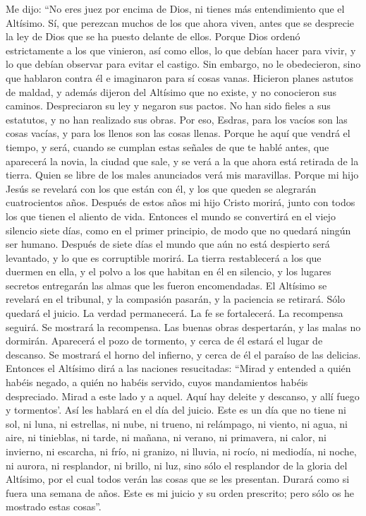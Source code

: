  Me dijo: ``No eres juez por encima de Dios, ni tienes
más entendimiento que el Altísimo.  Sí, que perezcan
muchos de los que ahora viven, antes que se desprecie la ley de Dios que
se ha puesto delante de ellos.  Porque Dios ordenó
estrictamente a los que vinieron, así como ellos, lo que debían hacer
para vivir, y lo que debían observar para evitar el castigo.
 Sin embargo, no le obedecieron, sino que hablaron contra
él e imaginaron para sí cosas vanas.  Hicieron planes
astutos de maldad, y además dijeron del Altísimo que no existe, y no
conocieron sus caminos.  Despreciaron su ley y negaron
sus pactos. No han sido fieles a sus estatutos, y no han realizado sus
obras.  Por eso, Esdras, para los vacíos son las cosas
vacías, y para los llenos son las cosas llenas.  Porque
he aquí que vendrá el tiempo, y será, cuando se cumplan estas señales de
que te hablé antes, que aparecerá la novia, la ciudad que sale, y se
verá a la que ahora está retirada de la tierra.  Quien se
libre de los males anunciados verá mis maravillas. 
Porque mi hijo Jesús se revelará con los que están con él, y los que
queden se alegrarán cuatrocientos años.  Después de estos
años mi hijo Cristo morirá, junto con todos los que tienen el aliento de
vida.  Entonces el mundo se convertirá en el viejo
silencio siete días, como en el primer principio, de modo que no quedará
ningún ser humano.  Después de siete días el mundo que
aún no está despierto será levantado, y lo que es corruptible morirá.
 La tierra restablecerá a los que duermen en ella, y el
polvo a los que habitan en él en silencio, y los lugares secretos
entregarán las almas que les fueron encomendadas.  El
Altísimo se revelará en el tribunal, y la compasión pasarán, y la
paciencia se retirará.  Sólo quedará el juicio. La verdad
permanecerá. La fe se fortalecerá.  La recompensa
seguirá. Se mostrará la recompensa. Las buenas obras despertarán, y las
malas no dormirán.  Aparecerá el pozo de tormento, y
cerca de él estará el lugar de descanso. Se mostrará el horno del
infierno, y cerca de él el paraíso de las delicias. 
Entonces el Altísimo dirá a las naciones resucitadas: ``Mirad y entended
a quién habéis negado, a quién no habéis servido, cuyos mandamientos
habéis despreciado.  Mirad a este lado y a aquel. Aquí
hay deleite y descanso, y allí fuego y tormentos'. Así les hablará en el
día del juicio.  Este es un día que no tiene ni sol, ni
luna, ni estrellas,  ni nube, ni trueno, ni relámpago, ni
viento, ni agua, ni aire, ni tinieblas, ni tarde, ni mañana,
 ni verano, ni primavera, ni calor, ni invierno, ni
escarcha, ni frío, ni granizo, ni lluvia, ni rocío,  ni
mediodía, ni noche, ni aurora, ni resplandor, ni brillo, ni luz, sino
sólo el resplandor de la gloria del Altísimo, por el cual todos verán
las cosas que se les presentan.  Durará como si fuera una
semana de años.  Este es mi juicio y su orden prescrito;
pero sólo os he mostrado estas cosas''.

